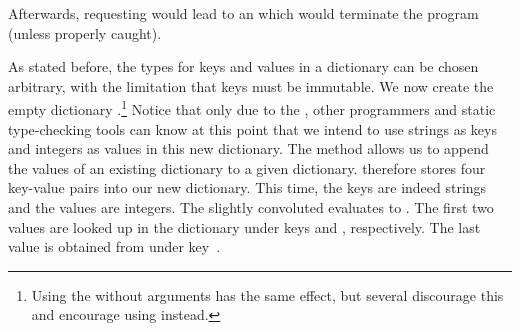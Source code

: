 Afterwards, requesting  would lead to an  which would terminate the program (unless properly caught).%
%
\begin{sloppypar}%
As stated before, the types for keys and values in a dictionary can be chosen arbitrary, with the limitation that keys must be immutable.
We now create the empty dictionary \pythonIdx{\textbraceleft\textbraceright}.\footnote{%
Using the  without arguments has the same effect, but several  discourage this and encourage using \pythonil{\{\}}\pythonIdx{\textbraceleft\textbraceright} instead.%
}
Notice that only due to the  , other programmers and static type-checking tools can know at this point that we intend to use strings as keys and integers as values in this new dictionary.
The  method allows us to append the values of an existing dictionary to a given dictionary.
 therefore stores four key-value pairs into our new dictionary.
This time, the keys are indeed strings and the values are integers.
The slightly convoluted   evaluates to .
The first two values are looked up in the  dictionary under keys  and , respectively.
The last value is obtained from  under key~.%
\end{sloppypar}%
%
\FloatBarrier%
\endhsection%
%
